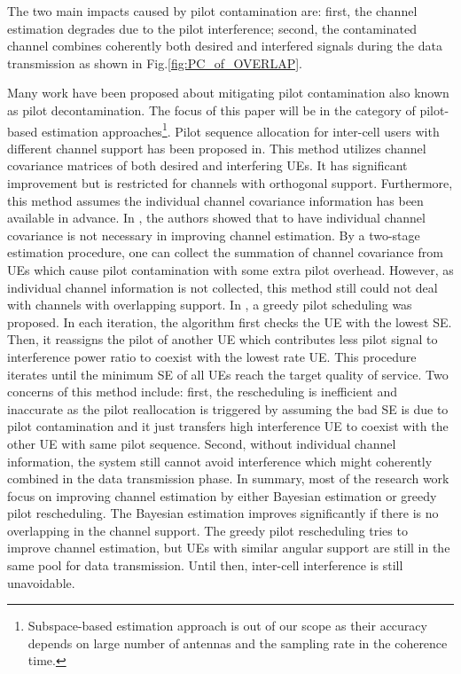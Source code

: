 The two main impacts caused by pilot contamination are: first, the channel estimation degrades due to the pilot interference; second, the contaminated channel combines coherently both desired and interfered signals during the data transmission as shown in Fig.\ref{fig:PC_of_OVERLAP}. 

Many work have been proposed about mitigating pilot contamination also known as pilot decontamination. The focus of this paper will be in the category of pilot-based estimation approaches\cite{elijah2016comprehensive}\footnote{Subspace-based estimation approach is out of our scope as their accuracy depends on large number of antennas and the sampling rate in the coherence time.}. Pilot sequence allocation for inter-cell users with different channel support has been proposed in\cite{yin2013coordinated,adhikary2013joint,you2015pilot}. This method utilizes channel covariance matrices of both desired and interfering UEs. It has significant improvement but is restricted for channels with orthogonal support. Furthermore, this method assumes the individual channel covariance information has been available in advance. In \cite{bjornson2016massive}, the authors showed that to have individual channel covariance is not necessary in improving channel estimation. By a two-stage estimation procedure, one can collect the summation of channel covariance from UEs which cause pilot contamination with some extra pilot overhead. However, as individual channel information is not collected, this method still could not deal with channels with overlapping support. In \cite{ngo2017cell}, a greedy pilot scheduling was proposed. In each iteration, the algorithm first checks the UE with the lowest SE. Then, it reassigns the pilot of another UE which contributes less pilot signal to interference power ratio to coexist with the lowest rate UE. This procedure iterates until the minimum SE of all UEs reach the target quality of service. Two concerns of this method include: first, the rescheduling is inefficient and inaccurate as the pilot reallocation is triggered by assuming the bad SE is due to pilot contamination and it just transfers high interference UE to coexist with the other UE with same pilot sequence. Second, without individual channel information, the system still cannot avoid interference which might coherently combined in the data transmission phase. In summary, most of the research work focus on improving channel estimation by either Bayesian estimation or greedy pilot rescheduling. The Bayesian estimation improves significantly if there is no overlapping in the channel support. The greedy pilot rescheduling tries to improve channel estimation, but UEs with similar angular support are still in the same pool for data transmission. Until then, inter-cell interference is still unavoidable.

